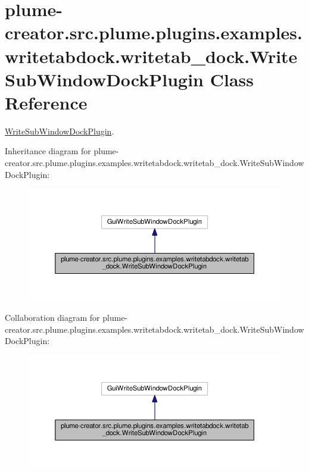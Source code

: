 \hypertarget{classplume-creator_1_1src_1_1plume_1_1plugins_1_1examples_1_1writetabdock_1_1writetab__dock_1_1_write_sub_window_dock_plugin}{}\section{plume-\/creator.src.\+plume.\+plugins.\+examples.\+writetabdock.\+writetab\+\_\+dock.\+Write\+Sub\+Window\+Dock\+Plugin Class Reference}
\label{classplume-creator_1_1src_1_1plume_1_1plugins_1_1examples_1_1writetabdock_1_1writetab__dock_1_1_write_sub_window_dock_plugin}


\hyperlink{classplume-creator_1_1src_1_1plume_1_1plugins_1_1examples_1_1writetabdock_1_1writetab__dock_1_1_write_sub_window_dock_plugin}{Write\+Sub\+Window\+Dock\+Plugin}.  




Inheritance diagram for plume-\/creator.src.\+plume.\+plugins.\+examples.\+writetabdock.\+writetab\+\_\+dock.\+Write\+Sub\+Window\+Dock\+Plugin\+:\nopagebreak
\begin{figure}[H]
\begin{center}
\leavevmode
\includegraphics[width=350pt]{classplume-creator_1_1src_1_1plume_1_1plugins_1_1examples_1_1writetabdock_1_1writetab__dock_1_1_e4e6df633333419dbd64537121109b6a}
\end{center}
\end{figure}


Collaboration diagram for plume-\/creator.src.\+plume.\+plugins.\+examples.\+writetabdock.\+writetab\+\_\+dock.\+Write\+Sub\+Window\+Dock\+Plugin\+:\nopagebreak
\begin{figure}[H]
\begin{center}
\leavevmode
\includegraphics[width=350pt]{classplume-creator_1_1src_1_1plume_1_1plugins_1_1examples_1_1writetabdock_1_1writetab__dock_1_1_6aed67e336a9d3b1d2c42cb69988965d}
\end{center}
\end{figure}
